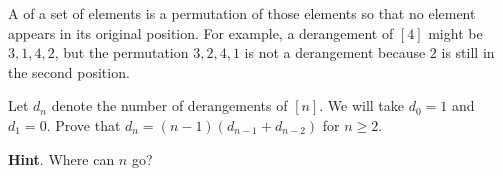 \documentclass{book}
\begin{document}
\setcounter{cpjt}{100}
\addtocounter{cpjt}{-1}
\begin{activity}\label{activity-93}
\hypertarget{p-702}{}%
A  of a set of elements is a permutation of those elements so that no element appears in its original position.  For example, a derangement of \([4]\) might be \(3,1,4,2\), but the permutation \(3,2,4,1\) is not a derangement because \(2\) is still in the second position.%
\par
\hypertarget{p-703}{}%
Let \(d_{n}\) denote the number of derangements of \([n]\).  We will take \(d_{0} = 1\) and \(d_{1} = 0\).  Prove that \(d_{n} = (n - 1)(d_{n - 1}+ d_{n - 2})\) for \(n \geq 2\).%
\par\smallskip%
\noindent\textbf{Hint}.\hypertarget{hint-54}{}\quad%
\hypertarget{p-704}{}%
Where can \(n\) go?%
\par\smallskip%
\noindent\end{activity}

\clearpage
\end{document}
